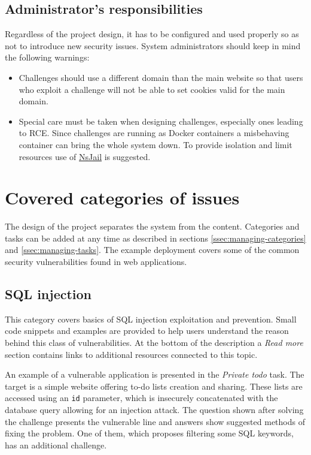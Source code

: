 \subsection{Administrator's responsibilities}

Regardless of the project design, it has to be configured and used properly so as not to introduce new security issues. System administrators should keep in mind the following warnings:

\begin{itemize}
    \item Challenges should use a different domain than the main website so that users who exploit a challenge will not be able to set cookies valid for the main domain.
    \item Special care must be taken when designing challenges, especially ones leading to RCE. Since challenges are running as Docker containers a misbehaving container can bring the whole system down. To provide isolation and limit resources use of \href{https://github.com/google/nsjail}{NsJail} is suggested.
\end{itemize}

\section{Covered categories of issues}
\label{sec:categories-of-issues}

The design of the project separates the system from the content. Categories and tasks can be added at any time as described in sections \ref{ssec:managing-categories} and \ref{ssec:managing-tasks}. The example deployment covers some of the common security vulnerabilities found in web applications.

\subsection{SQL injection}

This category covers basics of SQL injection exploitation and prevention. Small code snippets and examples are provided to help users understand the reason behind this class of vulnerabilities. At the bottom of the description a \textit{Read more} section contains links to additional resources connected to this topic.

An example of a vulnerable application is presented in the \textit{Private todo} task. The target is a simple website offering to-do lists creation and sharing. These lists are accessed using an \texttt{id} parameter, which is insecurely concatenated with the database query allowing for an injection attack. The question shown after solving the challenge presents the vulnerable line and answers show suggested methods of fixing the problem. One of them, which proposes filtering some SQL keywords, has an additional challenge.

